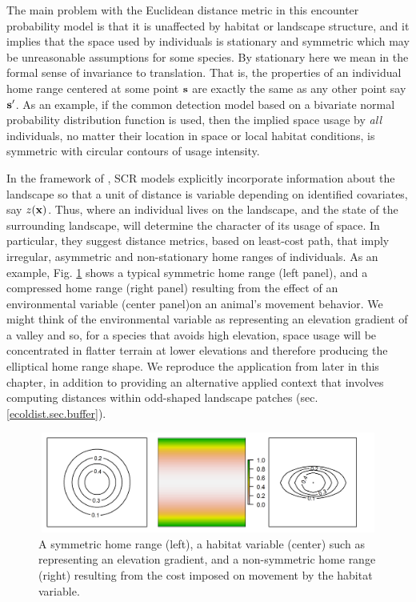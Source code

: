 The main problem with the Euclidean distance metric in this encounter
probability model is
 that it is unaffected by
habitat or landscape structure, and it implies that the space used by
individuals is stationary and symmetric which may be unreasonable
assumptions for some species. By stationary here we mean in the formal
sense of
invariance to translation. That is, the properties of an individual
home range centered at some point ${\bf s}$ are exactly the same as
any other point say ${\bf s}'$.
As an example, if the common detection model based on a bivariate
normal probability distribution function is used, then the implied
space usage by {\it all} individuals, no matter their location in
space or local habitat conditions, is symmetric with circular contours
of usage intensity.

In the framework of \citet{royle_etal:2012ecol}, SCR models explicitly
incorporate information about the landscape so that a unit of distance
is variable depending on identified covariates, say $z({\bf x})$.
Thus, where an individual lives on the landscape, and the state of the
surrounding landscape, will determine the character of its usage of
space. In particular, they suggest distance metrics, based on
least-cost path, that imply irregular, asymmetric and non-stationary
home ranges of individuals. As an example, Fig. \ref{fig.distort}
shows a typical symmetric home range (left panel), and a compressed
home range (right panel) resulting from the effect of an environmental
variable (center panel)on an animal's movement behavior. We might
think of the environmental variable as representing an elevation
gradient of a valley and so, for a species that avoids high elevation,
space usage will be concentrated in flatter terrain at lower
elevations and therefore producing the elliptical home range shape.
We reproduce the application from \citet{royle_etal:2012ecol} later in
this chapter, in addition to providing an alternative applied context
that involves computing distances within odd-shaped landscape patches
(sec. \ref{ecoldist.sec.buffer}).


\begin{figure}[h]
\centering
\includegraphics[width=5in,height=1.3in]{Ch10-EcolDist/figs/distort}
\caption{A symmetric home range (left), a habitat variable (center)
  such as representing an elevation gradient,
  and a non-symmetric home range (right) resulting from the cost imposed on
  movement by the habitat variable.}
\label{fig.distort}
\end{figure}


